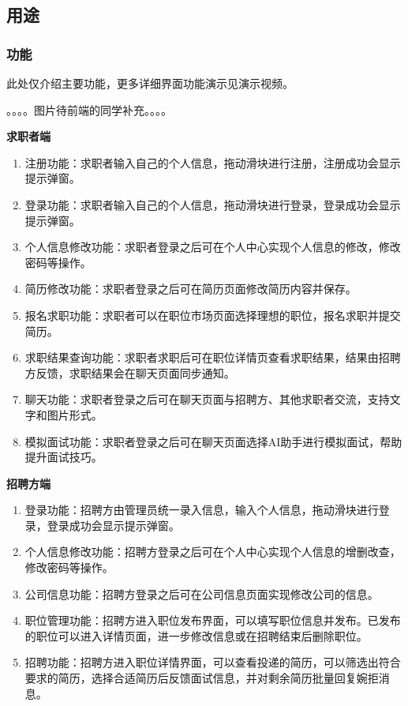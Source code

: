 \documentclass[UTF8,a4paper,10pt]{ctexart}
\begin{document}
\subsection{用途}

\subsubsection{功能}

此处仅介绍主要功能，更多详细界面功能演示见演示视频。

。。。。图片待前端的同学补充。。。。

\textbf{求职者端}
\begin{enumerate}
    \item 注册功能：求职者输入自己的个人信息，拖动滑块进行注册，注册成功会显示提示弹窗。
    \item 登录功能：求职者输入自己的个人信息，拖动滑块进行登录，登录成功会显示提示弹窗。
    \item 个人信息修改功能：求职者登录之后可在个人中心实现个人信息的修改，修改密码等操作。
    \item 简历修改功能：求职者登录之后可在简历页面修改简历内容并保存。
    \item 报名求职功能：求职者可以在职位市场页面选择理想的职位，报名求职并提交简历。
    \item 求职结果查询功能：求职者求职后可在职位详情页查看求职结果，结果由招聘方反馈，求职结果会在聊天页面同步通知。
    \item 聊天功能：求职者登录之后可在聊天页面与招聘方、其他求职者交流，支持文字和图片形式。
    \item 模拟面试功能：求职者登录之后可在聊天页面选择AI助手进行模拟面试，帮助提升面试技巧。
\end{enumerate}

\textbf{招聘方端}
\begin{enumerate}
    \item 登录功能：招聘方由管理员统一录入信息，输入个人信息，拖动滑块进行登录，登录成功会显示提示弹窗。
    \item 个人信息修改功能：招聘方登录之后可在个人中心实现个人信息的增删改查，修改密码等操作。
    \item 公司信息功能：招聘方登录之后可在公司信息页面实现修改公司的信息。
    \item 职位管理功能：招聘方进入职位发布界面，可以填写职位信息并发布。已发布的职位可以进入详情页面，进一步修改信息或在招聘结束后删除职位。
    \item 招聘功能：招聘方进入职位详情界面，可以查看投递的简历，可以筛选出符合要求的简历，选择合适简历后反馈面试信息，并对剩余简历批量回复婉拒消息。    
\end{enumerate}
\end{document}
